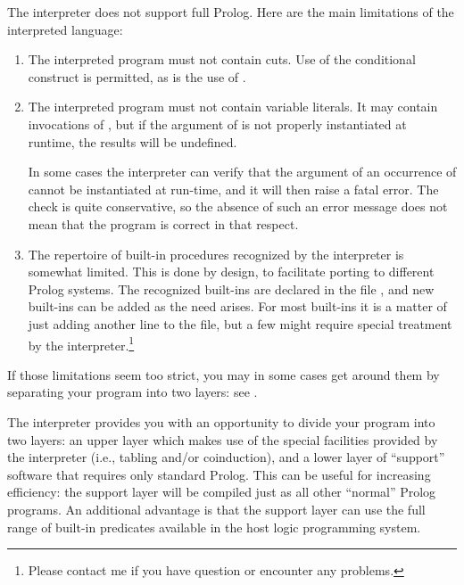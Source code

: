 



The interpreter does not support full Prolog.  Here are the main limitations
of the interpreted language:
\begin{enumerate}

\item
  The interpreted program must not contain cuts.  Use of the conditional
  construct is permitted, as is the use of .

\item
  The interpreted program must not contain variable literals.  It may contain
  invocations of , but if the argument of  is not
  properly instantiated at runtime, the results will be undefined.

  In some cases the interpreter can verify that the argument of an occurrence
  of  cannot be instantiated at run-time, and it will then raise
  a fatal error.  The check is quite conservative, so the absence of such an
  error message does not mean that the program is correct in that respect.

\item
  The repertoire of built-in procedures recognized by the interpreter is
  somewhat limited.  This is done by design, to facilitate porting to
  different Prolog systems.  The recognized built-ins are declared in the
  file , and new built-ins can be added as the need
  arises.  For most built-ins it is a matter of just adding another line to
  the file, but a few might require special treatment by the
  interpreter.\footnote{
    Please contact me if you have question or encounter any problems.}
\end{enumerate}

If those limitations seem too strict, you may in some cases get around them
by separating your program into two layers: see .



The interpreter provides you with an opportunity to divide your program into
two layers: an upper layer which makes use of the special facilities provided
by the interpreter (i.e., tabling and/or coinduction), and a lower layer of
``support'' software that requires only standard Prolog.  This can be useful
for increasing efficiency: the support layer will be compiled just as all
other ``normal'' Prolog programs.  An additional advantage is that the
support layer can use the full range of built-in predicates available in the
host logic programming system.

